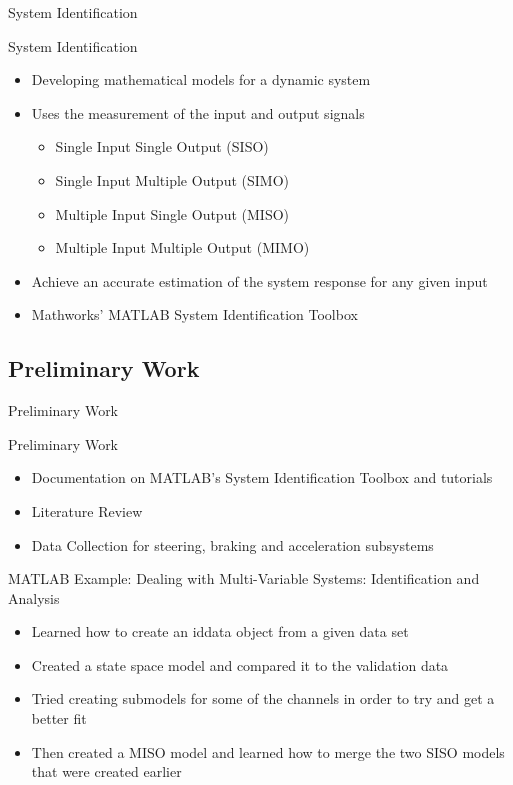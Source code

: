 \documentclass{beamer}
\begin{document}
\begin{frame}{System Identification}
  \begin{block}{System Identification}
 \begin{itemize}
        \item Developing mathematical models for a dynamic system
        \item Uses the measurement of the input and output signals
        \begin{itemize}
        		\item Single Input Single Output (SISO)
        		\item Single Input Multiple Output (SIMO)
        		\item Multiple Input Single Output (MISO)
        		\item Multiple Input Multiple Output (MIMO)
        \end{itemize}
        \item Achieve an accurate estimation of the system response for any given input
        \item Mathworks' MATLAB System Identification Toolbox
\end{itemize}
  \end{block}
\end{frame}

\subsection{Preliminary Work}

\begin{frame}{Preliminary Work}
  \begin{block}{Preliminary Work}
 \begin{itemize}
        \item Documentation on MATLAB's System Identification Toolbox and tutorials
        \item Literature Review 
        \item Data Collection for steering, braking and acceleration subsystems
\end{itemize}
  \end{block}
  
   \begin {block}{MATLAB Example: Dealing with Multi-Variable Systems: Identification and Analysis}
  \begin{itemize}
  	\item  Learned how to create an iddata object from a given data set 
  	\item Created a state space model and compared it to the validation data 
  	\item Tried creating submodels for some of the channels in order to try and get a better fit 
  	\item Then created a MISO model and learned how to merge the two SISO models that were created earlier 
  	\end{itemize}
  	\end{block}

\end{frame}
\end{document}
